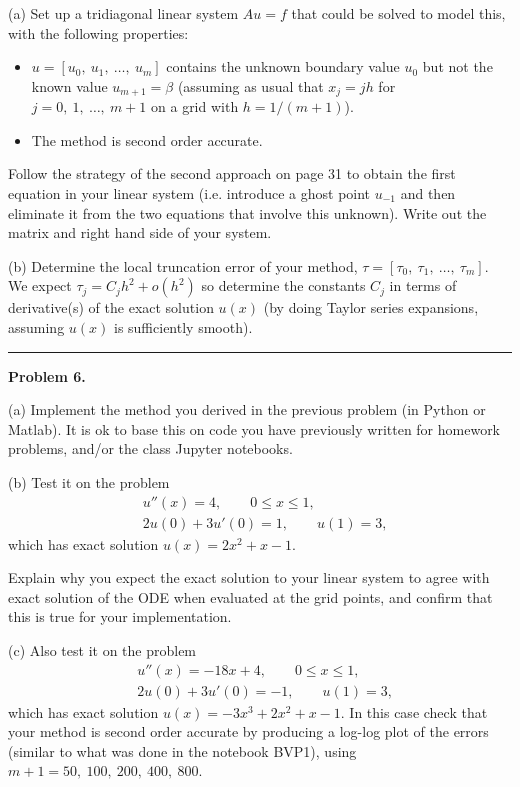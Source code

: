 \documentclass[10pt]{article}
\begin{document}
\newpage
(a) Set up a tridiagonal linear system $Au=f$ that could be solved to
model this, with the following properties:
\begin{itemize}
\item $u = [u_0,~u_1,~\ldots,~u_m]$ contains the unknown boundary value $u_0$ 
but not the known value $u_{m+1} = \beta$ (assuming as usual that $x_j = jh$
for $j=0,~1,~\ldots,~m+1$ on a grid with $h=1/(m+1)$).
\item The method is second order accurate. 
\end{itemize}
Follow the strategy of the second approach on page 31 to obtain the first
equation in your linear system (i.e. introduce a ghost point $u_{-1}$ and 
then eliminate it from the two equations that involve this unknown).
Write out the matrix and right hand side of your system.

(b) Determine the local truncation error of your method, 
$\tau = [\tau_0,~\tau_1,~\ldots,~\tau_m]$.  We expect $\tau_j = C_jh^2 + o(h^2)$
so determine the constants $C_j$ in terms of derivative(s) of the exact solution
$u(x)$ (by doing Taylor series expansions, assuming $u(x)$ is sufficiently
smooth).





\vskip 1cm
\hrule
{\bf Problem 6.}

(a) Implement the method you derived in the previous problem (in Python or Matlab).
It is ok to base this on code you have previously written for homework problems,
and/or the class Jupyter notebooks.

(b) Test it on the problem
\begin{align*}
&u''(x) = 4, \qquad 0\leq x \leq 1,\\
&2u(0) + 3u'(0) = 1, \qquad u(1)=3,
\end{align*}
which has exact solution $u(x) = 2x^2 + x - 1$.

Explain why you expect the exact solution to your linear system to agree with
exact solution of the ODE when evaluated at the grid points, and confirm that
this is true for your implementation.

(c) Also test it on the problem
\begin{align*}
&u''(x) = -18x + 4, \qquad 0\leq x \leq 1,\\
&2u(0) + 3u'(0) = -1, \qquad u(1)=3,
\end{align*}
which has exact solution $u(x) = -3x^3 + 2x^2 + x - 1$.
In this case check that your method is second order accurate by producing
a log-log plot of the errors (similar to what was done in the notebook BVP1),
using $m+1 = 50,~100,~200,~400,~800$.





\end{document}
